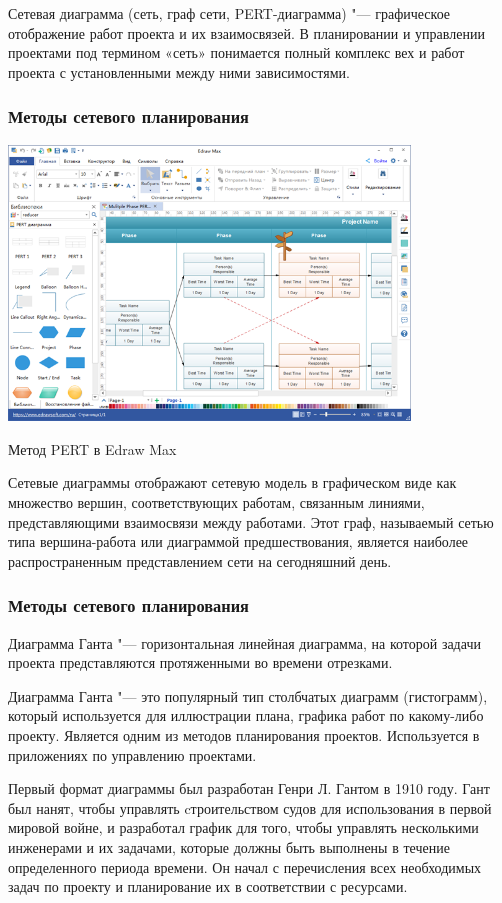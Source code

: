 \documentclass{../industrial-development}
\begin{document}
Сетевая диаграмма (сеть, граф сети, PERT-диаграмма) "--- графическое отображение работ проекта и их взаимосвязей. В планировании и управлении проектами под термином «сеть» понимается полный комплекс вех и работ проекта с установленными между ними зависимостями.

    \begin{frame} \frametitle{Методы сетевого планирования}
         \centerline{\includegraphics[width=0.8\textwidth]{pert.png}}
	\centerline{Метод PERT в Edraw Max}
    \end{frame}
    \lecturenotes

Сетевые диаграммы отображают сетевую модель в графическом виде как множество вершин, соответствующих работам, связанным линиями, представляющими взаимосвязи между работами. Этот граф, называемый сетью типа вершина-работа или диаграммой предшествования, является наиболее распространенным представлением сети на сегодняшний день.

    \begin{frame} \frametitle{Методы сетевого планирования}
        \begin{definition}
         Диаграмма Ганта "--- горизонтальная линейная диаграмма, на которой задачи проекта представляются протяженными во времени отрезками.
        \end{definition}
    \end{frame}
    \lecturenotes 

Диаграмма Ганта "--- это популярный тип столбчатых диаграмм (гистограмм), который используется для иллюстрации плана, графика работ по какому-либо проекту. Является одним из методов планирования проектов. Используется в приложениях по управлению проектами.

Первый формат диаграммы был разработан Генри Л. Гантом в 1910 году. Гант был нанят, чтобы управлять cтроительством судов для использования в первой мировой войне, и разработал график для того, чтобы управлять несколькими инженерами и их задачами, которые должны быть выполнены в течение определенного периода времени. Он начал с перечисления всех необходимых задач по проекту и планирование их в соответствии с ресурсами.
\end{document}
